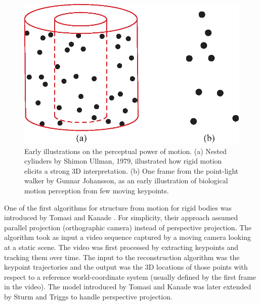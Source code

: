 
\begin{figure}
    \centerline{
        \includegraphics[width=.7\linewidth]{figures/sfm/demos_motivation.eps}
    }
    \caption{Early illustrations on the perceptual power of motion. (a) Nested cylinders by Shimon Ullman, 1979, illustrated how rigid motion elicits a strong 3D interpretation. (b) One frame from the point-light walker by Gunnar Johansson, as an early illustration of biological motion perception from few moving keypoints.}
    \label{fig:demos_motivation_sfm}
\end{figure}


One of the first algorithms for structure from motion for rigid bodies was introduced by Tomasi and Kanade \cite{Tomasi92}. For simplicity, their approach assumed parallel projection (orthographic camera) instead of perspective projection. The algorithm took as input a video sequence captured by a moving camera looking at a static scene. The video was first processed by extracting keypoints and tracking them over time. The input to the reconstruction algorithm was the keypoint trajectories and the output was the 3D locations of those points with respect to a reference world-coordinate system (usually defined by the first frame in the video).
The model introduced by Tomasi and Kanade was later extended by Sturm and Triggs \cite{Sturm1996} to handle perspective projection.

